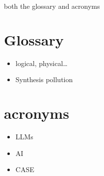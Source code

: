 both the glossary and acronyms

\section{Glossary}\label{glossary}

\begin{itemize}
\tightlist
\item
  logical, physical\ldots{}
\item
  Synthesis pollution
\end{itemize}

\section{acronyms}\label{acronyms}

\begin{itemize}
\tightlist
\item
  LLMs
\item
  AI
\item
  CASE
\end{itemize}
